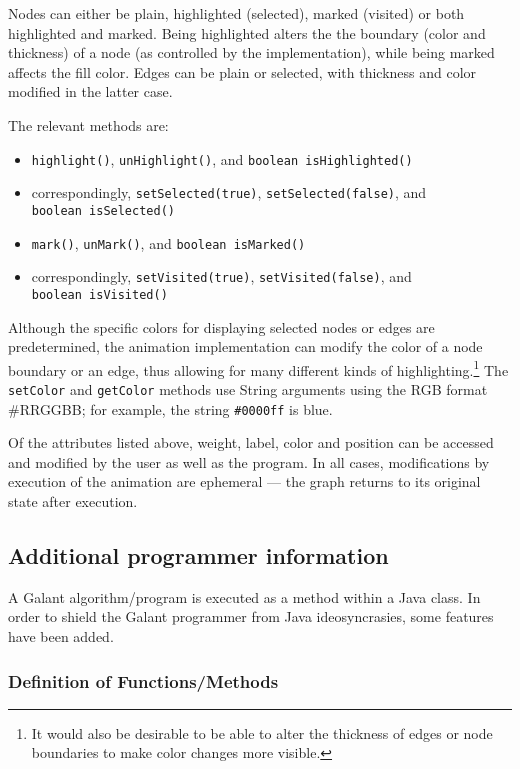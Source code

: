 Nodes can either be plain, highlighted (selected), marked (visited) or both highlighted and
marked.
Being highlighted alters the
the boundary (color and thickness) of a node (as controlled by the
implementation), while being marked affects the fill color.
Edges can be plain or selected, with thickness and color modified in the
latter case.

The relevant methods are:
\begin{itemize}
\item \texttt{highlight()}, \texttt{unHighlight()}, and \texttt{boolean~isHighlighted()}
\item correspondingly, \texttt{setSelected(true)}, \texttt{setSelected(false)},
and \texttt{boolean~isSelected()}
\item \texttt{mark()}, \texttt{unMark()}, and \texttt{boolean~isMarked()}
\item correspondingly, \texttt{setVisited(true)}, \texttt{setVisited(false)},
and \texttt{boolean~isVisited()}
\end{itemize}

Although the specific colors for displaying selected nodes or edges are
predetermined, the animation implementation can modify the color of a node boundary
or an edge, thus allowing for many different kinds of highlighting.\footnote{
It would also be desirable to be able to alter the thickness of edges or node boundaries to make color changes more visible.
}
The \texttt{setColor} and \texttt{getColor} methods use String arguments
using the RGB format \textsf{\#RRGGBB}; for example,
the string \texttt{\#0000ff} is blue.

Of the attributes listed above, weight, label, color and position can be
accessed and modified by the user as well as the program.
In all cases, modifications by execution of the animation are ephemeral --- the graph returns to its original state after execution.

\subsection{Additional programmer information}

A Galant algorithm/program is executed as a method within a Java class.
In order to shield the Galant programmer from Java ideosyncrasies,
some features have been added.

\subsubsection*{Definition of Functions/Methods}


